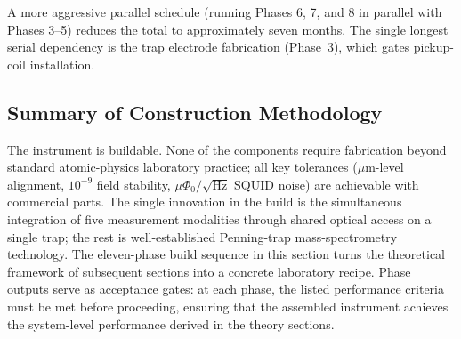 A more aggressive parallel schedule (running Phases 6, 7, and 8 in parallel with Phases 3--5) reduces the total to approximately seven months. The single longest serial dependency is the trap electrode fabrication (Phase~3), which gates pickup-coil installation.

\subsection{Summary of Construction Methodology}
\label{subsec:construction_summary}

The instrument is buildable. None of the components require fabrication beyond standard atomic-physics laboratory practice; all key tolerances ($\mu$m-level alignment, $10^{-9}$ field stability, $\mu\Phi_0/\sqrt{\text{Hz}}$ SQUID noise) are achievable with commercial parts. The single innovation in the build is the simultaneous integration of five measurement modalities through shared optical access on a single trap; the rest is well-established Penning-trap mass-spectrometry technology. The eleven-phase build sequence in this section turns the theoretical framework of subsequent sections into a concrete laboratory recipe. Phase outputs serve as acceptance gates: at each phase, the listed performance criteria must be met before proceeding, ensuring that the assembled instrument achieves the system-level performance derived in the theory sections.
